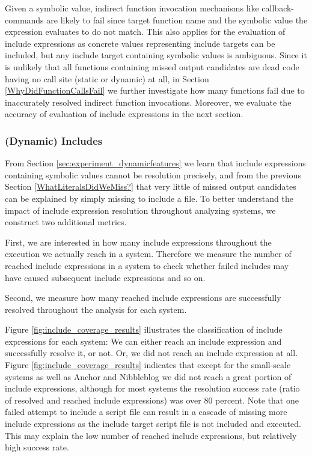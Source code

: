 \documentclass[sigconf, preprint]{acmart}
\renewcommand{\sf}[1]{\textsf{#1}}
\begin{document}
Given a symbolic value, indirect function invocation mechanisms like
callback-commands are likely to fail since target function name and the symbolic
value the expression evaluates to do not match.
This also applies for the evaluation of include expressions as concrete values
representing include targets can be included, but any include target containing
symbolic values is ambiguous. Since it is unlikely that all functions containing
missed output candidates are dead code having no call site (static or dynamic)
at all, in Section \ref{WhyDidFunctionCallsFail} we further investigate how
many functions fail due to inaccurately resolved indirect function invocations.
Moreover, we evaluate the accuracy of evaluation of include expressions in the next section.

\subsubsection{(Dynamic) Includes}
\label{WhyDidIncludesFail}
From Section \ref{sec:experiment_dynamicfeatures} we learn that include
expressions containing symbolic values cannot be resolution precisely, and from
the previous Section \ref{WhatLiteralsDidWeMiss?} that very little of missed
output candidates can be explained by simply missing to include a file. To
better understand the impact of include expression resolution throughout
analyzing systems, we construct two additional metrics.

First, we are interested in how many include expressions throughout the
execution we actually reach in a system. Therefore we measure the number of
reached include expressions in a system to check whether failed includes may
have caused subsequent include expressions and so on. 

Second, we measure how many reached include expressions are
successfully resolved throughout the analysis for each system.

Figure \ref{fig:include_coverage_results} illustrates the classification of
include expressions for each system: We can either reach an include expression
and successfully resolve it, or not. Or, we did not reach an include expression at all. 
Figure \ref{fig:include_coverage_results} indicates that except for the
small-scale systems as well as \sf{Anchor} and \sf{Nibbleblog} we did not
reach a great portion of include expressions, although for most systems the
resolution success rate (ratio of resolved and reached include expressions) was
over 80 percent. Note that one failed attempt to include a script file can 
result in a cascade of missing more include expressions as the include target
script file is not included and executed. This may explain the low number of
reached include expressions, but relatively high success rate.
\end{document}
